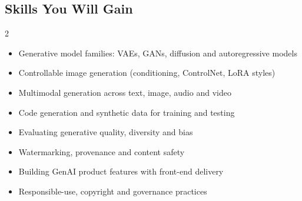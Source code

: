 \documentclass[10pt,a4paper]{article}
\begin{document}
\subsection*{Skills You Will Gain}\begin{multicols}{2}\begin{itemize}\small
\item Generative model families: VAEs, GANs, diffusion and autoregressive models
\item Controllable image generation (conditioning, ControlNet, LoRA styles)
\item Multimodal generation across text, image, audio and video
\item Code generation and synthetic data for training and testing
\item Evaluating generative quality, diversity and bias
\item Watermarking, provenance and content safety
\item Building GenAI product features with front-end delivery
\item Responsible-use, copyright and governance practices
\end{itemize}\end{multicols}
\end{document}
